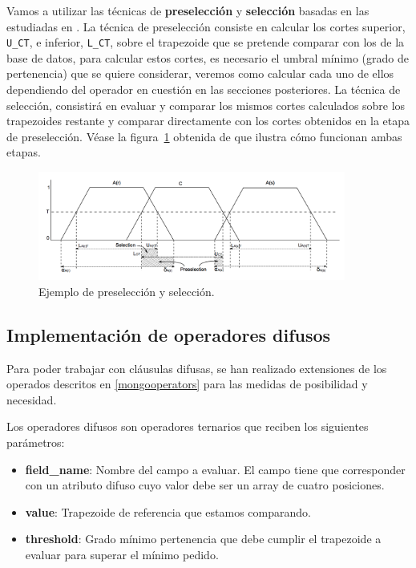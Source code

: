 Vamos a utilizar las técnicas de \textbf{preselección} y \textbf{selección} basadas en las estudiadas en \cite{indexingstrategies}. La técnica de preselección consiste en calcular los cortes superior, \texttt{U\_CT}, e inferior, \texttt{L\_CT}, sobre el trapezoide que se pretende comparar con los de la base de datos, para calcular estos cortes, es necesario el umbral mínimo (grado de pertenencia) que se quiere considerar, veremos como calcular cada uno de ellos dependiendo del operador en cuestión en las secciones posteriores. La técnica de selección, consistirá en evaluar y comparar los mismos cortes calculados sobre los trapezoides restante y comparar directamente con los cortes obtenidos en la etapa de preselección. Véase la figura~\ref{fig:preselection} obtenida de \cite{indexingstrategies} que ilustra cómo funcionan ambas etapas.

\begin{figure}[h]
  \centering
  \includegraphics[width=0.9\textwidth]{gfx/preselection.png}
  \caption{\label{fig:preselection}Ejemplo de preselección y selección.}
\end{figure}

\subsection{Implementación de operadores difusos}

Para poder trabajar con cláusulas difusas, se han realizado extensiones de los operados descritos en \ref{mongooperators} para las medidas de posibilidad y necesidad.

Los operadores difusos son operadores ternarios que reciben los siguientes parámetros:

\begin{itemize}
    \item \textbf{field\_name}: Nombre del campo a evaluar. El campo tiene que corresponder con un atributo difuso cuyo valor debe ser un array de cuatro posiciones. 
    \item \textbf{value}: Trapezoide de referencia que estamos comparando.
    \item \textbf{threshold}: Grado mínimo pertenencia que debe cumplir el trapezoide a evaluar para superar el mínimo pedido.
\end{itemize}

